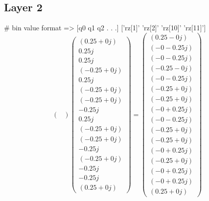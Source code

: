\documentclass{article}%
\begin{document}
\subsection{Layer 2}%
\label{subsec:Layer2}%
\#  bin value format       => {[}q0 q1 q2 . . .{]}\newline%
%
{[}'rz{[}1{]}' 'rz{[}2{]}' 'rz{[}10{]}' 'rz{[}11{]}'{]}%
\[%
\begin{pmatrix}%
%
\end{pmatrix} \begin{pmatrix}%
(0.25+0j)\\%
0.25j\\%
0.25j\\%
(-0.25+0j)\\%
0.25j\\%
(-0.25+0j)\\%
(-0.25+0j)\\%
-0.25j\\%
0.25j\\%
(-0.25+0j)\\%
(-0.25+0j)\\%
-0.25j\\%
(-0.25+0j)\\%
-0.25j\\%
-0.25j\\%
(0.25+0j)%
\end{pmatrix} = \begin{pmatrix}%
(0.25-0j)\\%
(-0-0.25j)\\%
(-0-0.25j)\\%
(-0.25-0j)\\%
(-0-0.25j)\\%
(-0.25+0j)\\%
(-0.25+0j)\\%
(-0+0.25j)\\%
(-0-0.25j)\\%
(-0.25+0j)\\%
(-0.25+0j)\\%
(-0+0.25j)\\%
(-0.25+0j)\\%
(-0+0.25j)\\%
(-0+0.25j)\\%
(0.25+0j)%
\end{pmatrix}%
\]

%
\end{document}
